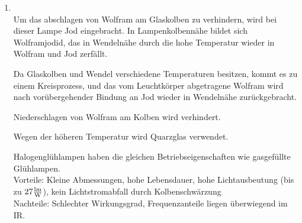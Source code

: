 \begin{enumerate}
    \item   {}\\
    
    Um das abschlagen von Wolfram am Glaskolben zu verhindern, wird bei dieser Lampe Jod eingebracht. In Lampenkolbennähe bildet
    sich Wolframjodid, das in Wendelnähe durch die hohe Temperatur wieder in Wolfram und
    Jod zerfällt.
    
    Da Glaskolben und Wendel verschiedene Temperaturen besitzen, kommt es zu einem
    Kreisprozess, und das vom Leuchtkörper abgetragene Wolfram wird nach vorübergehender
    Bindung an Jod wieder in Wendelnähe zurückgebracht.
    
    Niederschlagen von Wolfram am Kolben wird verhindert.
    
    Wegen der höheren Temperatur wird Quarzglas verwendet.
    
    Halogenglühlampen haben die gleichen Betriebseigenschaften wie gasgefüllte Glühlampen.\\ 
    
            Vorteile: Kleine Abmessungen, hohe Lebensdauer, hohe Lichtausbeutung (bis zu $27\frac{\textnormal{lm}}{\textnormal{W}}$), kein Lichtstromabfall durch Kolbenschwärzung\\
            Nachteile: Schlechter Wirkungsgrad, Frequenzanteile liegen überwiegend im IR.
\end{enumerate}